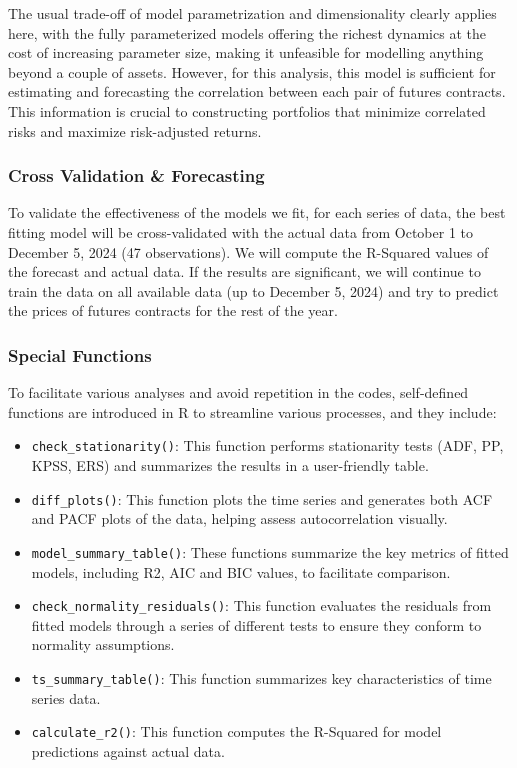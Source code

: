 \documentclass[11pt]{article}
\begin{document}
The usual trade-off of model parametrization and dimensionality clearly applies here, with the fully parameterized models offering the richest dynamics at the cost of increasing parameter size, making it unfeasible for modelling anything beyond a couple of assets. However, for this analysis, this model is sufficient for estimating and forecasting the correlation between each pair of futures contracts. This information is crucial to constructing portfolios that minimize correlated risks and maximize risk-adjusted returns.

\subsubsection{Cross Validation \& Forecasting}

To validate the effectiveness of the models we fit, for each series of data, the best fitting model will be cross-validated with the actual data from October 1 to December 5, 2024 (47 observations). We will compute the R-Squared values of the forecast and actual data. If the results are significant, we will continue to train the data on all available data (up to December 5, 2024) and try to predict the prices of futures contracts for the rest of the year.

\subsubsection{Special Functions}

To facilitate various analyses and avoid repetition in the codes, self-defined functions are introduced in R to streamline various processes, and they include:

\begin{itemize}
\item \texttt{check\_stationarity()}: This function performs stationarity tests (ADF, PP, KPSS, ERS) and summarizes the results in a user-friendly table.
\item \texttt{diff\_plots()}: This function plots the time series and generates both ACF and PACF plots of the data, helping assess autocorrelation visually.
\item \texttt{model\_summary\_table()}: These functions summarize the key metrics of fitted models, including R2, AIC and BIC values, to facilitate comparison.
\item \texttt{check\_normality\_residuals()}: This function evaluates the residuals from fitted models through a series of different tests to ensure they conform to normality assumptions.
\item \texttt{ts\_summary\_table()}: This function summarizes key characteristics of time series data.
\item \texttt{calculate\_r2()}: This function computes the R-Squared for model predictions against actual data.
\end{itemize}
\end{document}
